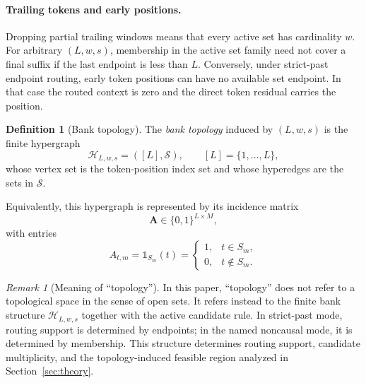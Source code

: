 \documentclass{article}
\newcommand{\mathbbm}[1]{\mathds{#1}}
\theoremstyle{plain}
\theoremstyle{definition}
\newtheorem{definition}[theorem]{Definition}
\theoremstyle{remark}
\newtheorem{remark}[theorem]{Remark}
\begin{document}
\paragraph{Trailing tokens and early positions.}
Dropping partial trailing windows means that every active set has cardinality $w$. For arbitrary $(L,w,s)$, membership in the active set family need not cover a final suffix if the last endpoint is less than $L$. Conversely, under strict-past endpoint routing, early token positions can have no available set endpoint. In that case the routed context is zero and the direct token residual carries the position.

\begin{definition}[Bank topology]
\label{def:bank-topology}
The \emph{bank topology} induced by $(L,w,s)$ is the finite hypergraph
\begin{equation}
\label{eq:bank-topology}
\mathcal{H}_{L,w,s}=([L],\mathcal S),
\qquad
[L]=\{1,\dots,L\},
\end{equation}
whose vertex set is the token-position index set and whose hyperedges are the sets in $\mathcal S$.

Equivalently, this hypergraph is represented by its incidence matrix
\begin{equation}
\label{eq:incidence-matrix}
\mathbf A\in\{0,1\}^{L\times M},
\end{equation}
with entries
\begin{equation}
\label{eq:incidence-entry}
A_{t,m}=\mathbbm{1}_{S_m}(t)=
\begin{cases}
1,& t\in S_m,\\
0,& t\notin S_m.
\end{cases}
\end{equation}
\end{definition}

\begin{remark}[Meaning of ``topology'']
\label{rem:topology-meaning}
In this paper, ``topology'' does not refer to a topological space in the sense of open sets. It refers instead to the finite bank structure $\mathcal H_{L,w,s}$ together with the active candidate rule. In strict-past mode, routing support is determined by endpoints; in the named noncausal mode, it is determined by membership. This structure determines routing support, candidate multiplicity, and the topology-induced feasible region analyzed in Section~\ref{sec:theory}.
\end{remark}
\end{document}
